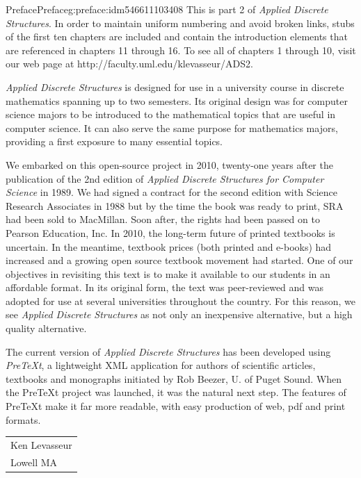 \documentclass[oneside,10pt,]{book}
\numberwithin{equation}{section}
\begin{document}
\begin{preface}{Preface}{}{Preface}{}{}{g:preface:idm546611103408}
This is part 2 of \emph{Applied Discrete Structures}.  In order to maintain uniform numbering and avoid broken links, stubs of the first ten chapters are included and contain the introduction  elements that are referenced in chapters 11 through 16.  To see all of chapters 1 through 10, visit our web page at http:\slash{}\slash{}faculty.uml.edu\slash{}klevasseur\slash{}ADS2.%
\par
\emph{Applied Discrete Structures} is designed for use in a university course in discrete mathematics spanning up to two semesters.   Its original design was for computer science majors to be introduced to the mathematical topics that are useful in computer science.   It can also serve the same purpose for mathematics majors, providing a first exposure to many essential topics.%
\par
We embarked on this open-source project in 2010, twenty-one years after the publication of the 2nd edition of \emph{Applied Discrete Structures for Computer Science} in 1989.   We had signed a contract for the second edition with Science Research Associates in 1988 but by the time the book was ready to print, SRA had been sold to MacMillan. Soon after, the rights had been passed on to Pearson Education, Inc. In 2010, the long-term future of printed textbooks is uncertain. In the meantime, textbook prices (both printed and e-books) had increased and a growing open source textbook movement had started. One of our objectives in revisiting this text is to make it available to our students in an affordable format. In its original form, the text was peer-reviewed and was adopted for use at several universities throughout the country. For this reason, we see \emph{Applied Discrete Structures} as not only an inexpensive alternative, but a high quality alternative.%
\par
The current version of \emph{Applied Discrete Structures} has been developed using \emph{PreTeXt}, a lightweight XML application for authors of scientific articles, textbooks and monographs initiated by Rob Beezer, U. of Puget Sound.  When the PreTeXt project was launched, it was the natural next step.  The features of PreTeXt make it far more readable, with easy production of web, pdf and print formats.%
\nopagebreak\par%
\hfill\begin{tabular}[t]{l@{}}
Ken Levasseur\\
Lowell MA
\end{tabular}\\\par
\end{preface}
\end{document}
